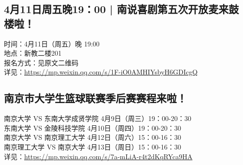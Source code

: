 \documentclass[letterpaper, 12pt]{article}
\begin{document}
\begin{multicols}{2}
\subsection{4月11日周五晚19：00 | 南说喜剧第五次开放麦来鼓楼啦！}
时间：4月11日（周五）晚 19:00
\\地点：新教二楼201
\\报名方式：见原文二维码
\\详见：\url{https://mp.weixin.qq.com/s/1F-iO0AMHIYsbyH6GDIcgQ}

\subsection{南京市大学生篮球联赛季后赛赛程来啦！}
南京大学 VS 东南大学成贤学院 4月9日（周三）19：00-20：30
\\东南大学 VS 金陵科技学院 4月10日（周四）19：00-20：30
\\南京大学 VS 南京理工大学 4月12日（周六）15：00-16：30
\\南京理工大学 VS 南京大学 4月13日（周日）15：00-16：30
\\详见：\url{https://mp.weixin.qq.com/s/7a-mLiA-r4t2dKqRYca9HA}
\end{multicols}
\end{document}
